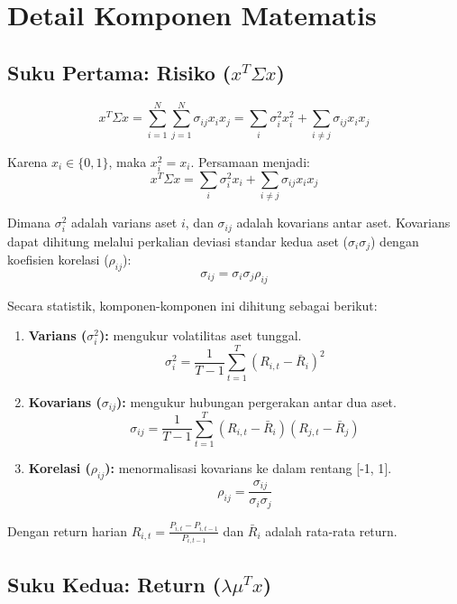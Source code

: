 \documentclass[12pt,a4paper]{article}
\providecommand{\tightlist}{%
  \setlength{\itemsep}{0pt}\setlength{\parskip}{0pt}}
\begin{document}
\hypertarget{detail-komponen-matematis}{%
\section{Detail Komponen Matematis}\label{detail-komponen-matematis}}

\hypertarget{a.-suku-pertama-risiko-xt-sigma-x}{%
\subsection{\texorpdfstring{Suku Pertama: Risiko (\(x^T \Sigma x\))}{Suku Pertama: Risiko (x\^{}T \textbackslash Sigma x)}}\label{a.-suku-pertama-risiko-xt-sigma-x}}

\[ x^T \Sigma x = \sum_{i=1}^N \sum_{j=1}^N \sigma_{ij} x_i x_j = \sum_i \sigma^2_i x_i^2 + \sum_{i \ne j} \sigma_{ij} x_i x_j \]

Karena \(x_i \in \{0,1\}\), maka \(x_i^2 = x_i\). Persamaan menjadi: \[ x^T \Sigma x = \sum_i \sigma_i^2 x_i + \sum_{i \ne j} \sigma_{ij} x_i x_j \]

Dimana \(\sigma^2_i\) adalah varians aset \(i\), dan \(\sigma_{ij}\) adalah kovarians antar aset. Kovarians dapat dihitung melalui perkalian deviasi standar kedua aset (\(\sigma_i \sigma_j\)) dengan koefisien korelasi (\(\rho_{ij}\)): \[ \sigma_{ij} = \sigma_i \sigma_j \rho_{ij} \]

Secara statistik, komponen-komponen ini dihitung sebagai berikut: 
\begin{enumerate}
\def\labelenumi{\arabic{enumi}.}
\tightlist
    \item \textbf{Varians (\(\sigma_i^2\)):} mengukur volatilitas aset tunggal. \[ \sigma_i^2 = \frac{1}{T-1} \sum_{t=1}^T (R_{i,t} - \bar{R}_i)^2 \]
    \item \textbf{Kovarians (\(\sigma_{ij}\)):} mengukur hubungan pergerakan antar dua aset. \[ \sigma_{ij} = \frac{1}{T-1} \sum_{t=1}^T (R_{i,t} - \bar{R}_i)(R_{j,t} - \bar{R}_j) \]
    \item \textbf{Korelasi (\(\rho_{ij}\)):} menormalisasi kovarians ke dalam rentang {[}-1, 1{]}. \[ \rho_{ij} = \frac{\sigma_{ij}}{\sigma_i \sigma_j} \]
\end{enumerate}
Dengan return harian \(R_{i,t} = \frac{P_{i,t} - P_{i,t-1}}{P_{i,t-1}}\) dan \(\bar{R}_i\) adalah rata-rata return.

\hypertarget{b.-suku-kedua-return-lambda-mut-x}{%
\subsection{\texorpdfstring{Suku Kedua: Return (\(\lambda \mu^T x\))}{Suku Kedua: Return (\textbackslash lambda \textbackslash mu\^{}T x)}}\label{b.-suku-kedua-return-lambda-mut-x}}
\end{document}
